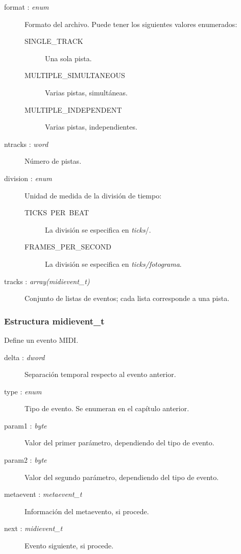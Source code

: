 \begin{description}
	\item[format : \textit{enum}] Formato del archivo. Puede tener los siguientes valores enumerados:
	
	\begin{description}
		\item[SINGLE\_TRACK] Una sola pista.
		\item[MULTIPLE\_SIMULTANEOUS] Varias pistas, simultáneas.
		\item[MULTIPLE\_INDEPENDENT] Varias pistas, independientes.
	\end{description}
	
	\item[ntracks : \textit{word}] Número de pistas.
	
	\item[division : \textit{enum}] Unidad de medida de la división de tiempo:
	
	\begin{description}
		\item[TICKS\ PER\ BEAT] La división se especifica en \textit{ticks}/\quarternote.
		\item[FRAMES\_PER\_SECOND] La división se especifica en \textit{ticks/fotograma}.
	\end{description}
	
	\item[tracks : \textit{array(midievent\_t)}] Conjunto de listas de eventos; cada lista corresponde a una pista.

\end{description}

\subsubsection{Estructura midievent\_t}

Define un evento \acrshort{MIDI}.

\begin{description}
	\item[delta : \textit{dword}] Separación temporal respecto al evento anterior.
	\item[type : \textit{enum}] Tipo de evento. Se enumeran en el capítulo anterior.
	\item[param1 : \textit{byte}] Valor del primer parámetro, dependiendo del tipo de evento.
	\item[param2 : \textit{byte}] Valor del segundo parámetro, dependiendo del tipo de evento.
	\item[metaevent : \textit{metaevent\_t}] Información del metaevento, si procede.
	\item[next : \textit{midievent\_t}] Evento siguiente, si procede.
\end{description}

